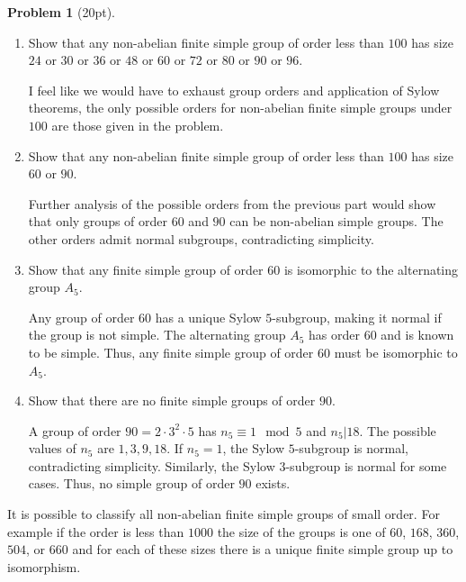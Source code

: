 \documentclass[12pt]{article}
\theoremstyle{definition}
\newtheorem{problem}{Problem}
\begin{document}
\begin{problem}[20pt]
\begin{enumerate}[label=\arabic*.]
          \item Show that any non-abelian finite simple group of order less than $100$ has size 
                $24$ or $30$ or $36$ or $48$ or $60$ or $72$ or $80$ or $90$ or $96$.
  
          \begin{solution}
          I feel like we would have to exhaust group orders and application of Sylow theorems, the only possible orders for non-abelian finite simple groups under $100$ are those given in the problem.
          \end{solution}
  
          \item Show that any non-abelian finite simple group of order less than $100$ has size $60$
                or $90$.
  
          \begin{solution}
          Further analysis of the possible orders from the previous part would show that only groups of order $60$ and $90$ can be non-abelian simple groups. The other orders admit normal subgroups, contradicting simplicity.
          \end{solution}
  
          \item Show that any finite simple group of order $60$ is isomorphic to the alternating group
                $A_5$.
  
          \begin{solution}
          Any group of order $60$ has a unique Sylow $5$-subgroup, making it normal if the group is not simple. The alternating group $A_5$ has order $60$ and is known to be simple. Thus, any finite simple group of order $60$ must be isomorphic to $A_5$.
          \end{solution}
  
          \item Show that there are no finite simple groups of order $90$.
          
          \begin{solution}
          A group of order $90 = 2 \cdot 3^2 \cdot 5$ has $n_5 \equiv 1 \mod 5$ and $n_5 | 18$. The possible values of $n_5$ are $1, 3, 9, 18$. If $n_5 = 1$, the Sylow $5$-subgroup is normal, contradicting simplicity. Similarly, the Sylow $3$-subgroup is normal for some cases. Thus, no simple group of order $90$ exists.
          \end{solution}
      \end{enumerate}
      It is possible to classify all non-abelian finite simple groups of small order. 
      For example if the order is less than $1000$ the size of the groups is one of
      $60$, $168$, $360$, $504$, or $660$ and for each of these sizes there is a unique
      finite simple group up to isomorphism.
  \end{problem}
\end{document}
